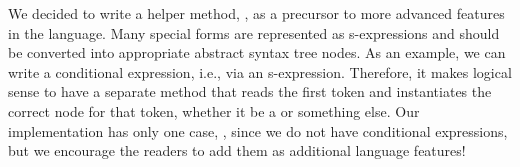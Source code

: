 We decided to write a helper method, , as a precursor to more advanced features in the language. 
Many special forms are represented as s-expressions and should be converted into appropriate abstract syntax tree nodes. 
As an example, we can write a conditional expression, i.e.,  via an s-expression. 
Therefore, it makes logical sense to have a separate method that reads the first token and instantiates the correct node for that token, whether it be a  or something else. 
Our implementation has only one case, , since we do not have conditional expressions, but we encourage the readers to add them as additional language features!

